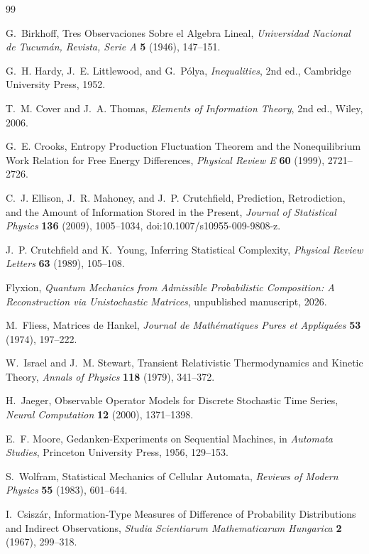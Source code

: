 \documentclass[11pt,oneside]{book}
\theoremstyle{definition}
\theoremstyle{remark}
\begin{document}
\backmatter

\begin{thebibliography}{99}

G.~Birkhoff,
Tres Observaciones Sobre el Algebra Lineal,
\emph{Universidad Nacional de Tucum\'an, Revista, Serie A} \textbf{5} (1946), 147--151.

G.~H. Hardy, J.~E. Littlewood, and G.~P\'olya,
\emph{Inequalities}, 2nd ed.,
Cambridge University Press, 1952.

T.~M. Cover and J.~A. Thomas,
\emph{Elements of Information Theory}, 2nd ed.,
Wiley, 2006.

G.~E. Crooks,
Entropy Production Fluctuation Theorem and the Nonequilibrium Work Relation for Free Energy Differences,
\emph{Physical Review E} \textbf{60} (1999), 2721--2726.

C.~J. Ellison, J.~R. Mahoney, and J.~P. Crutchfield,
Prediction, Retrodiction, and the Amount of Information Stored in the Present,
\emph{Journal of Statistical Physics} \textbf{136} (2009), 1005--1034, doi:10.1007/s10955-009-9808-z.

J.~P. Crutchfield and K.~Young,
Inferring Statistical Complexity,
\emph{Physical Review Letters} \textbf{63} (1989), 105--108.

Flyxion,
\emph{Quantum Mechanics from Admissible Probabilistic Composition: A Reconstruction via Unistochastic Matrices},
unpublished manuscript, 2026.

M.~Fliess,
Matrices de Hankel,
\emph{Journal de Math\'ematiques Pures et Appliqu\'ees} \textbf{53} (1974), 197--222.

W.~Israel and J.~M. Stewart,
Transient Relativistic Thermodynamics and Kinetic Theory,
\emph{Annals of Physics} \textbf{118} (1979), 341--372.

H.~Jaeger,
Observable Operator Models for Discrete Stochastic Time Series,
\emph{Neural Computation} \textbf{12} (2000), 1371--1398.

E.~F. Moore,
Gedanken-Experiments on Sequential Machines,
in \emph{Automata Studies}, Princeton University Press, 1956, 129--153.

S.~Wolfram,
Statistical Mechanics of Cellular Automata,
\emph{Reviews of Modern Physics} \textbf{55} (1983), 601--644.

I.~Csisz\'ar,
Information-Type Measures of Difference of Probability Distributions and Indirect Observations,
\emph{Studia Scientiarum Mathematicarum Hungarica} \textbf{2} (1967), 299--318.


\end{thebibliography}
\end{document}
